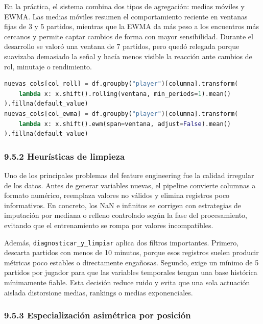 En la práctica, el sistema combina dos tipos de agregación: medias móviles y EWMA. Las medias móviles resumen el comportamiento reciente en ventanas fijas de 3 y 5 partidos,
mientras que la EWMA da más peso a los encuentros más cercanos y permite captar cambios de forma con mayor sensibilidad. Durante el desarrollo se valoró una ventana de 7 partidos,
pero quedó relegada porque suavizaba demasiado la señal y hacía menos visible la reacción ante cambios de rol, minutaje o rendimiento.
 
\begin{lstlisting}[language=Python,caption={Agregación temporal con medias móviles y EWMA para capturar evolución de jugadores}]
nuevas_cols[col_roll] = df.groupby("player")[columna].transform(
    lambda x: x.shift().rolling(ventana, min_periods=1).mean()
).fillna(default_value)
nuevas_cols[col_ewma] = df.groupby("player")[columna].transform(
    lambda x: x.shift().ewm(span=ventana, adjust=False).mean()
).fillna(default_value)
\end{lstlisting}
 
\subsubsection{9.5.2 Heurísticas de limpieza}
 
Uno de los principales problemas del feature engineering fue la calidad irregular de los datos. Antes de generar variables nuevas, el pipeline
convierte columnas a formato numérico, reemplaza valores no válidos y elimina registros poco informativos. En concreto, los NaN e infinitos se
corrigen con estrategias de imputación por mediana o relleno controlado según la fase del procesamiento, evitando que el entrenamiento se rompa
por valores incompatibles.
 
Además, \texttt{diagnosticar\_y\_limpiar} aplica dos filtros importantes. Primero, descarta partidos con menos de 10 minutos, porque esos registros
suelen producir métricas poco estables o directamente engañosas. Segundo, exige un mínimo de 5 partidos por jugador para que las variables temporales
tengan una base histórica mínimamente fiable. Esta decisión reduce ruido y evita que una sola actuación aislada distorsione medias, rankings o medias exponenciales.
 
\subsubsection{9.5.3 Especialización asimétrica por posición}
 
